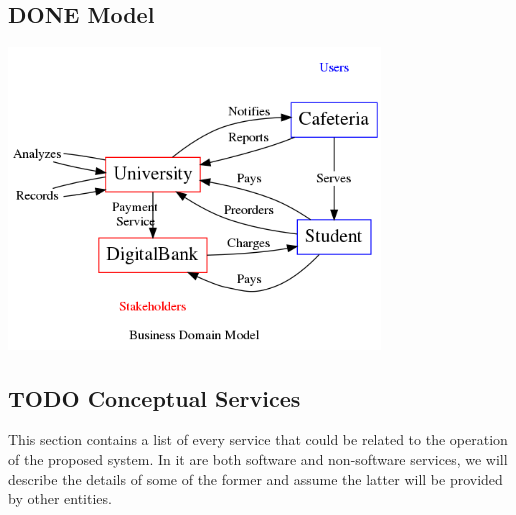 \documentclass[11pt]{article}
\begin{document}
\subsection{{\bfseries\sffamily DONE} Model}
\label{sec:org62d4191}
\begin{center}
\includegraphics[height=8cm]{res/business_domain.png}
\end{center}

\subsection{{\bfseries\sffamily TODO} Conceptual Services}
\label{sec:orgf8fad10}
This section contains a list of every service that could be related
to the operation of the proposed system. In it are both software
and non-software services, we will describe the details of some of
the former and assume the latter will be provided by other
entities.
\end{document}
